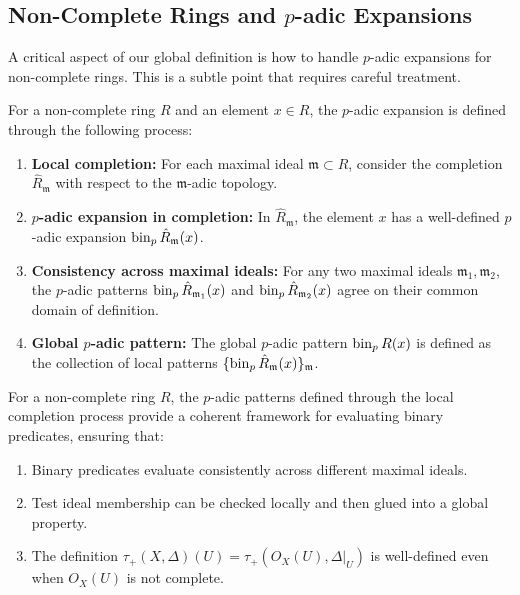 \subsection{Non-Complete Rings and $p$-adic Expansions}

A critical aspect of our global definition is how to handle $p$-adic expansions for non-complete rings. This is a subtle point that requires careful treatment.

\begin{definition}\label{def:local-completion-process}
For a non-complete ring $R$ and an element $x \in R$, the $p$-adic expansion is defined through the following process:

\begin{enumerate}
    \item \textbf{Local completion:} For each maximal ideal $\mathfrak{m} \subset R$, consider the completion $\hat{R}_\mathfrak{m}$ with respect to the $\mathfrak{m}$-adic topology.
    
    \item \textbf{$p$-adic expansion in completion:} In $\hat{R}_\mathfrak{m}$, the element $x$ has a well-defined $p$-adic expansion $\operatorname{bin}_p{\hat{R}_\mathfrak{m}}(x)$.
    
    \item \textbf{Consistency across maximal ideals:} For any two maximal ideals $\mathfrak{m}_1, \mathfrak{m}_2$, the $p$-adic patterns $\operatorname{bin}_p{\hat{R}_{\mathfrak{m}_1}}(x)$ and $\operatorname{bin}_p{\hat{R}_{\mathfrak{m}_2}}(x)$ agree on their common domain of definition.
    
    \item \textbf{Global $p$-adic pattern:} The global $p$-adic pattern $\operatorname{bin}_p{R}(x)$ is defined as the collection of local patterns $\{\operatorname{bin}_p{\hat{R}_\mathfrak{m}}(x)\}_{\mathfrak{m}}$.
\end{enumerate}
\end{definition}

\begin{theorem}\label{thm:non-complete-coherence}
For a non-complete ring $R$, the $p$-adic patterns defined through the local completion process provide a coherent framework for evaluating binary predicates, ensuring that:

\begin{enumerate}
    \item Binary predicates evaluate consistently across different maximal ideals.
    
    \item Test ideal membership can be checked locally and then glued into a global property.
    
    \item The definition $\tau_+(X,\Delta)(U) = \tau_+(O_X(U),\Delta|_U)$ is well-defined even when $O_X(U)$ is not complete.
\end{enumerate}
\end{theorem}

